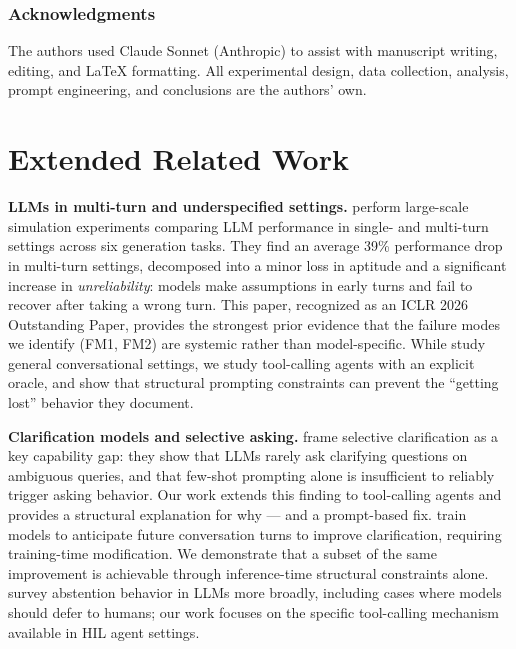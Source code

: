 \documentclass{article} %
\begin{document}
\subsubsection*{Acknowledgments}

The authors used Claude Sonnet (Anthropic) to assist with manuscript writing,
editing, and \LaTeX{} formatting.
All experimental design, data collection, analysis, prompt engineering,
and conclusions are the authors' own.




\appendix

\section{Extended Related Work}
\label{app:related}

\textbf{LLMs in multi-turn and underspecified settings.}
\citet{llmslost2025} perform large-scale simulation experiments comparing LLM performance
in single- and multi-turn settings across six generation tasks.
They find an average 39\% performance drop in multi-turn settings, decomposed into a minor
loss in aptitude and a significant increase in \emph{unreliability}: models make assumptions
in early turns and fail to recover after taking a wrong turn.
This paper, recognized as an ICLR 2026 Outstanding Paper, provides the strongest prior
evidence that the failure modes we identify (FM1, FM2) are systemic rather than model-specific.
While \citet{llmslost2025} study general conversational settings, we study tool-calling agents
with an explicit oracle, and show that structural prompting constraints can prevent the
``getting lost'' behavior they document.

\textbf{Clarification models and selective asking.}
\citet{selective_clarification2022} frame selective clarification as a key capability gap:
they show that LLMs rarely ask clarifying questions on ambiguous queries, and that few-shot
prompting alone is insufficient to reliably trigger asking behavior.
Our work extends this finding to tool-calling agents and provides a structural explanation
for why --- and a prompt-based fix.
\citet{modeling_clarification2024} train models to anticipate future conversation turns to
improve clarification, requiring training-time modification.
We demonstrate that a subset of the same improvement is achievable through inference-time
structural constraints alone.
\citet{abstention_survey2024} survey abstention behavior in LLMs more broadly, including
cases where models should defer to humans; our work focuses on the specific tool-calling
mechanism available in HIL agent settings.
\end{document}
